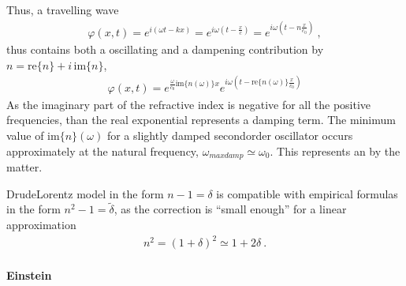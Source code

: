 \documentclass[letterpaper,10pt,english]{jupyterBook}
\begin{document}
\sphinxAtStartPar
Thus, a travelling wave
\begin{equation*}
\begin{split}\varphi(x,t) = e^{i (\omega t - k x)} = e^{i \omega \left( t - \frac{x}{c} \right)} = e^{i \omega \left( t - n \frac{x}{c_0} \right)} \ ,\end{split}
\end{equation*}
\sphinxAtStartPar
thus contains both a oscillating and a dampening contribution by \(n = \text{re}\{ n \} + i \, \text{im}\{ n \}\),
\begin{equation*}
\begin{split}\varphi(x,t) = e^{\frac{\omega}{c_0} \text{im}\{ n(\omega) \} x} e^{i \omega \left( t - \text{re}\{ n(\omega) \} \frac{x}{c_0} \right)}\end{split}
\end{equation*}
\sphinxAtStartPar
As the imaginary part of the refractive index is negative for all the positive frequencies, than the real exponential represents a damping term. The minimum value of \(\text{im}\{ n \}(\omega)\) for a slightly damped second\sphinxhyphen{}order oscillator occurs approximately at the natural frequency, \(\omega_{max damp} \simeq \omega_0\). This represents an  by the matter.

\sphinxAtStartPar
{} Drude\sphinxhyphen{}Lorentz model in the form \(n - 1 = \delta\) is compatible with empirical formulas in the form \(n^2 - 1 = \widetilde{\delta}\), as the correction is “small enough” for a linear approximation
\begin{equation*}
\begin{split}n^2 = ( 1 + \delta )^2 \simeq 1 + 2 \delta \ .\end{split}
\end{equation*}

\paragraph{Einstein}
\label{\detokenize{ch/quantum-mechanics/history/light-dispersion:einstein}}
\end{document}
